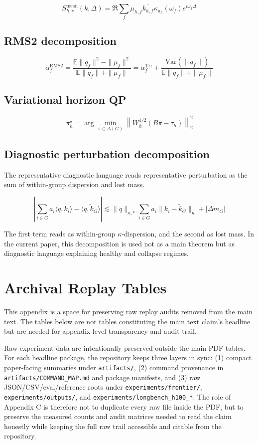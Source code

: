 $$
S^{\mathrm{mean}}_{h,\pi}(k, \Delta)
=
\Re
\sum_f
\mu_{h,f}
\overline{k_{h,f}}
\kappa_{\pi_h}(\omega_f)
e^{i\omega_f \Delta}
$$


\subsection{RMS2 decomposition}


$$
\alpha_f^{\mathrm{RMS2}}
=
\frac{\mathbb{E}\|q_f\|^2 - \|\mu_f\|^2}{\mathbb{E}\|q_f\| + \|\mu_f\|}
=
\alpha_f^{\mathrm{Tri}}
+
\frac{\mathrm{Var}(\|q_f\|)}{\mathbb{E}\|q_f\| + \|\mu_f\|}
$$


\subsection{Variational horizon QP}


$$
\pi_h^{\star}
=
\arg\min_{\pi \in \Delta(G)}
\left\|W_h^{1/2}(B\pi - \tau_h)\right\|_2^2
$$


\subsection{Diagnostic perturbation decomposition}


The representative diagnostic language reads representative perturbation as the sum of within-group dispersion and lost mass.


$$
\left|\sum_{i \in G} a_i \langle q, k_i \rangle - \langle q, \tilde{k}_G \rangle\right|
\lesssim
\|q\|_{\kappa,*} \sum_{i \in G} a_i \|k_i - \tilde{k}_G\|_{\kappa}
+
|\Delta m_G|
$$


The first term reads as within-group $\kappa$-dispersion, and the second as lost mass. In the current paper, this decomposition is used not as a main theorem but as diagnostic language explaining healthy and collapse regimes.


\section{Archival Replay Tables}


This appendix is a space for preserving raw replay audits removed from the main text. The tables below are not tables constituting the main text claim's headline but are needed for appendix-level transparency and audit trail.


Raw experiment data are intentionally preserved outside the main PDF tables. For each headline package, the repository keeps three layers in sync: (1) compact paper-facing summaries under \texttt{artifacts/}, (2) command provenance in \texttt{artifacts/COMMAND\_MAP.md} and package manifests, and (3) raw JSON/CSV/eval/reference roots under \texttt{experiments/frontier/}, \texttt{experiments/outputs/}, and \texttt{experiments/longbench\_h100\_*}. The role of Appendix C is therefore not to duplicate every raw file inside the PDF, but to preserve the measured counts and audit matrices needed to read the claim honestly while keeping the full raw trail accessible and citable from the repository.


